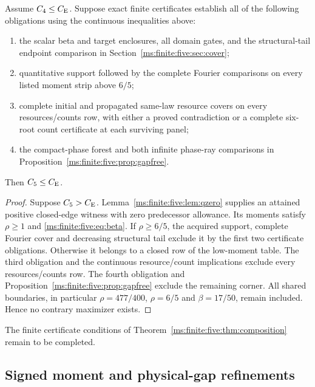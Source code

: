 \begin{theorem}
\label{ms:finite:five:thm:composition}
Assume $C_4\le C_{\mathrm E}$. Suppose exact finite certificates establish all
of the following obligations using the continuous inequalities above:
\begin{enumerate}
\item the scalar beta and target enclosures, all domain gates, and the
      structural-tail endpoint comparison in Section~\ref{ms:finite:five:sec:cover};
\item quantitative support followed by the complete Fourier comparisons
      on every listed moment strip above $6/5$;
\item complete initial and propagated same-law resource covers on every
      resources/counts row, with either a proved contradiction or a
      complete six-root count certificate at each surviving panel;
\item the compact-phase forest and both infinite phase-ray comparisons
      in Proposition~\ref{ms:finite:five:prop:gapfree}.
\end{enumerate}
Then $C_5\le C_{\mathrm E}$.
\end{theorem}
\begin{proof}
Suppose $C_5>C_{\mathrm E}$. Lemma~\ref{ms:finite:five:lem:qzero} supplies an attained
positive closed-edge witness with zero predecessor allowance. Its
moments satisfy $\rho\ge1$ and \eqref{ms:finite:five:eq:beta}.
If $\rho\ge6/5$, the acquired support, complete Fourier cover and
decreasing structural tail exclude it by the first two certificate
obligations. Otherwise it belongs to a closed row of the low-moment
table. The third obligation and the continuous resource/count
implications exclude every resources/counts row. The fourth obligation
and Proposition~\ref{ms:finite:five:prop:gapfree} exclude the remaining corner.
All shared boundaries, in particular $\rho=477/400$, $\rho=6/5$
and $\beta=17/50$, remain included. Hence no contrary maximizer exists.
\end{proof}

The finite certificate conditions of
Theorem~\ref{ms:finite:five:thm:composition} remain to be completed.

\subsection{Signed moment and physical-gap refinements}
\label{ms:finite:signed-refinements}

